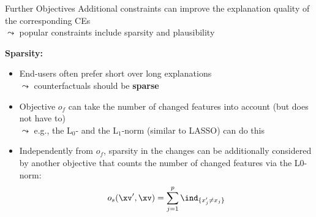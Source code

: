 \documentclass[11pt,compress,t,notes=noshow, aspectratio=169, xcolor=table, usenames,dvipsnames]{beamer}
\begin{document}
\begin{frame}{Further Objectives}
	Additional constraints can improve the explanation quality of the corresponding CEs\\
	$\leadsto$ popular constraints include sparsity and plausibility
	
	\lz

	\textbf{Sparsity:}
	\begin{itemize}[<+->]
		\item End-users often prefer short over long explanations\\
		$\leadsto$ %
		counterfactuals should be \textbf{sparse} %
		\item Objective $o_f$ can take the number of changed features into account (but does not have to)\\
		$\leadsto$ e.g., the L$_0$- and the L$_1$-norm (similar to LASSO) can do this
        \item Independently from $o_f$, sparsity in the changes can be additionally considered by another objective that counts the number of changed features via the L0-norm:
        $$o_s(\xv', \xv) = \sum_{j = 1}^p {\ind}_{\{ x'_j \neq x_j \}}$$
	\end{itemize}
\end{frame}
\end{document}
